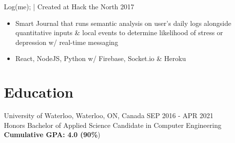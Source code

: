 \documentclass[]{friggeri-cv}
\begin{document}
\begin{entrylist}
{\begin{itemize}[leftmargin=*]
		\end{itemize}
	}
	\entry
	{Log(me); | \href{https://github.com/suzyng83209/htn2017}{\faGithub}}
	{\vspace{0.5\parsep}Created at Hack the North 2017}
	{
		\begin{itemize}[leftmargin=*]
			\vspace{-0.4cm}
			\item Smart Journal that runs semantic analysis on user's daily logs alongside quantitative inputs \& local events to determine likelihood of stress or depression w/ real-time messaging
			\item React, NodeJS, Python w/ Firebase, Socket.io \& Heroku
		\end{itemize}
	}
\end{entrylist}

\section{Education}

\begin{entrylist}
	\entry
	{University of Waterloo, Waterloo, ON, Canada \hfill{\normalfont\footnotesize SEP 2016 - APR 2021}}
	{\\{\normalsize\normalfont Honors Bachelor of Applied Science Candidate in Computer Engineering}}
	{\textbf{Cumulative GPA: 4.0 (90\%})}
\end{entrylist}

% 
\end{document}
